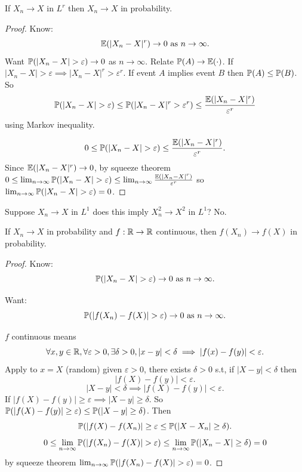 \documentclass[10pt, a4paper]{article}
\begin{document}
\begin{proposition}
    If $X_n \to X$ in $L ^ r$ then $X_n \to X$ in probability.

    \begin{proof}
        Know:
        \[
        \E(|X_n - X| ^ r) \to 0\text{ as } n \to \infty.
        \]
        Want $\P(|X_n - X| > \varepsilon) \to 0$ as $n \to \infty$.
        Relate $\P(A) \to \E(\cdot)$.
        If $|X_n - X| > \varepsilon \implies |X_n - X| ^ r > \varepsilon ^ r$.
        If event $A$ implies event $B$ then $\P(A) \leq \P(B)$.
        So
        \[
        \P(|X_n - X| > \varepsilon) \leq \P(|X_n - X| ^ r > \varepsilon ^ r) \leq \frac{\E(|X_n - X| ^ r)}{\varepsilon ^ r}
        \]
        using Markov inequality.

        \[
        0 \leq \P(|X_n - X| > \varepsilon) \leq \frac{\E(|X_n - X| ^ r)}{\varepsilon ^ r}.
        \]
        Since $\E(|X_n - X| ^ r) \to 0$,
        by squeeze theorem $0 \leq \lim_{n \to \infty}\P(|X_n - X| > \varepsilon) \leq \lim_{n \to \infty}\frac{\E(|X_n - X| ^ r)}{\varepsilon ^ r}$ so $\lim_{n \to \infty}\P(|X_n - X| > \varepsilon) = 0$.
    \end{proof}
\end{proposition}

Suppose $X_n \to X$ in $L ^ 1$ does this imply $X_n ^ 2 \to X ^ 2$ in $L ^ 1$?
No.

\begin{proposition}
    If $X_n \to X$ in probability and $f : \R \to \R$ continuous,
    then $f(X_n) \to f(X)$ in probability.

    \begin{proof}
        Know:
        \[
        \P(|X_n - X| > \varepsilon) \to 0 \text{ as } n \to \infty.
        \]

        Want:
        \[
        \P(|f(X_n) - f(X)| > \varepsilon) \to 0\text{ as } n \to \infty.
        \]

        $f$ continuous means
        \[
        \forall x, y \in \R, \forall \varepsilon > 0, \exists \delta > 0, |x - y| < \delta \implies |f(x) - f(y)| < \varepsilon.
        \]
        Apply to $x = X$
        (random)
        given $\varepsilon > 0$,
        there exists $\delta > 0$ s.t, if $|X - y| < \delta$ then
        \[
        |f(X) - f(y)| < \varepsilon.
        \]
        \[
        |X - y| < \delta \implies |f(X) - f(y)| < \varepsilon.
        \]
        If $|f(X) - f(y)| \geq \varepsilon \implies |X - y| \geq \delta$.
        So $\P(|f(X) - f(y)| \geq \varepsilon) \leq \P(|X - y| \geq \delta)$.
        Then
        \[
        \P(|f(X) - f(X_n)| \geq \varepsilon \leq \P(|X - X_n| \geq \delta).
        \]
        \[
        0 \leq \lim_{n \to \infty}\P(|f(X_n) - f(X)| > \varepsilon) \leq \lim_{n \to \infty}\P(|X_n - X| \geq \delta) = 0
        \]
        by squeeze theorem $\lim_{n \to \infty}\P(|f(X_n) - f(X)| > \varepsilon) = 0$.
    \end{proof}
\end{proposition}
\end{document}
